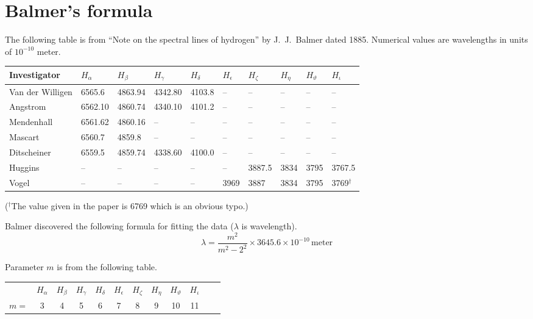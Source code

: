 

\section*{Balmer's formula}

The following table is from
``Note on the spectral lines of hydrogen''
by J.~J.~Balmer dated 1885.
Numerical values are wavelengths in units of $10^{-10}$ meter.
{\footnotesize\begin{center}
\begin{tabular}{|l|l|l|l|l|l|l|l|l|l|}
\hline
Investigator & $H_\alpha$ & $H_\beta$ & $H_\gamma$ & $H_\delta$ & $H_\epsilon$ &
$H_\zeta$ & $H_\eta$ & $H_\vartheta$ & $H_\iota$
\\
\hline
Van der Willigen & 6565.6 & 4863.94 & 4342.80 & 4103.8 & -- & -- & -- & -- & --
\\
Angstrom & 6562.10 & 4860.74 & 4340.10 & 4101.2 & -- & -- & -- & -- & --
\\
Mendenhall & 6561.62 & 4860.16 & -- & -- & -- & -- & -- & -- & --
\\
Mascart & 6560.7 & 4859.8 & -- & -- & -- & -- & -- & -- & --
\\
Ditscheiner & 6559.5 & 4859.74 & 4338.60 & 4100.0 & -- & -- & -- & -- & --
\\
Huggins & -- & -- & -- & -- & -- & 3887.5 & 3834 & 3795 & 3767.5
\\
Vogel & -- & -- & -- & -- & 3969 & 3887 & 3834 & 3795 & 3769${}^\dag$
\\
\hline
\end{tabular}

(${}^\dag$The value given in the paper is 6769 which is an obvious typo.)
\end{center}}%

Balmer discovered the following formula for fitting the data
($\lambda$ is wavelength).
\begin{equation*}
\lambda=\frac{m^2}{m^2-2^2}\times3645.6\times10^{-10}\,\text{meter}
\end{equation*}

Parameter $m$ is from the following table.
\begin{center}
\begin{tabular}{cccccccccccc}
& $H_\alpha$ & $H_\beta$ & $H_\gamma$ & $H_\delta$ & $H_\epsilon$ &
$H_\zeta$ & $H_\eta$ & $H_\vartheta$ & $H_\iota$
\\
$m=$ & 3 & 4 & 5 & 6 & 7 & 8 & 9 & 10 & 11
\end{tabular}
\end{center}

